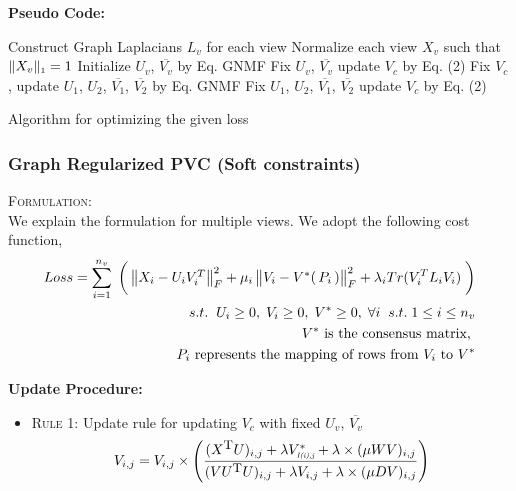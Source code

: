 \documentclass[a4paper]{article}
\begin{document}
	\noindent
	\textbf{Pseudo Code:}
	\begin{algorithm}
		Construct Graph Laplacians $L_{v}$ for each view\;
		Normalize each view $X_{v}$ such that $\|X_{v}\|_{\text{\tiny1}} = 1 $\;
		Initialize  $U_{v}$, $\overline{V_{v}}$ by Eq. GNMF\;
		Fix $U_{v}$, $\overline{V_{v}}$ update $V_{c}$ by Eq. (2)\;		
		{
			{
				Fix $V_{c}$, update $U_{1}$, $U_{2}$, $\overline{V_{1}}$, $\overline{V_{2}}$ by Eq. GNMF\;
			}
			Fix $U_{1}$, $U_{2}$, $\overline{V_{1}}$, $\overline{V_{2}}$ update $V_{c}$ by Eq. (2)\;
		}						
		\caption{Algorithm for optimizing the given loss}
	\end{algorithm}

	\subsubsection{Graph Regularized PVC (Soft constraints)}
	
	\textsc{Formulation:}\\
	We explain the formulation for multiple views. We adopt the following cost function,
	\begin{align*}	
	Loss = \displaystyle\sum_{i=1}^{n_{v}} \; \bigg(\begin{Vmatrix} X_{i}-U_{i}V^{T}_{i} \end{Vmatrix}^{2}_{F}	
		+ \mu_{i}\begin{Vmatrix} V_{i}-V^{*}(\, P_{i} \, ) \end{Vmatrix}^{2}_{F}
		+ \lambda_{i}Tr(V^{T}_{i}L_{i}V_{i}) \; \bigg)\\	
		s.t. \hspace{2mm}  U_{i}\geq0,\;V_{i}\geq0,\;V^{*}\geq0,\;\forall i \;\;s.t.\; 1 \leq i \leq n_{v}\\
		V^{*} \text{ is the consensus matrix, } \\
		P_{i} \text{ represents the mapping of rows from } V_{i} \text{ to } V^{*}\\
	\end{align*}	

	\noindent
	\textbf{Update Procedure:}
	\begin{itemize}
		\item \textsc{Rule 1:}	Update rule for updating $V_{c}$ with fixed $U_{v}$, $\overline{V_{v}}$
			\begin{multline}
			V_{i,j} = V_{i,j} \times \Bigg( \frac{(X^{\text{\small{T}}}U)_{i,j}+\lambda V^{*}_{{\textit{\tiny{I(i),j}}}} +\lambda \times (\mu WV)_{i,j}}{(V U^{\text{\small{T}}} U)_{i,j} + \lambda V_{i,j} +\lambda \times (\mu DV)_{i,j}} \Bigg) \\
			\end{multline}
	\end{itemize}		
	
\end{document}
